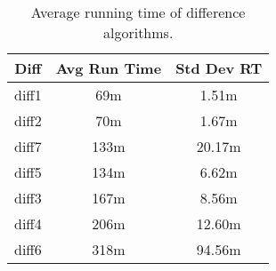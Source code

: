 \begin{table}[tbph]
\begin{center}
\begin{tabular}{|c||c|c|}
\hline
Diff & Avg Run Time & Std Dev RT  \\
\hline
\hline
diff1 & 69m & 1.51m \\
diff2 & 70m & 1.67m \\
diff7 & 133m & 20.17m \\
diff5 & 134m & 6.62m \\
diff3 & 167m & 8.56m \\
diff4 & 206m & 12.60m \\
diff6 & 318m & 94.56m \\
\hline
\end{tabular}
\end{center}
\caption{Average running time of difference algorithms.}
\label{tab:difftiming}
\end{table}
